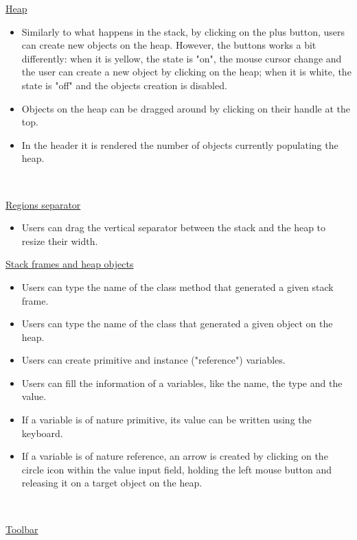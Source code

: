 \documentclass[]{usiinfbachelorproject}
\begin{document}
\ul{Heap}

\begin{itemize}
	\item Similarly to what happens in the stack, by clicking on the plus button, users can create new objects on the heap. However, the buttons works a bit differently: when it is yellow, the state is "on", the mouse cursor change and the user can create a new object by clicking on the heap; when it is white, the state is "off" and the objects creation is disabled.
	\item Objects on the heap can be dragged around by clicking on their handle at the top.
	\item In the header it is rendered the number of objects currently populating the heap.
\end{itemize}\

\ul{Regions separator}

\begin{itemize}
	\item Users can drag the vertical separator between the stack and the heap to resize their width.
\end{itemize}

\pagebreak

\ul{Stack frames and heap objects}

\begin{itemize}
	\item Users can type the name of the class method that generated a given stack frame.
	\item Users can type the name of the class that generated a given object on the heap.
	\item Users can create primitive and instance ("reference") variables.
	\item Users can fill the information of a variables, like the name, the type and the value.
	\item If a variable is of nature primitive, its value can be written using the keyboard.
	\item If a variable is of nature reference, an arrow is created by clicking on the circle icon within the value input field, holding the left mouse button and releasing it on a target object on the heap.
\end{itemize}\

\ul{Toolbar}
\end{document}
